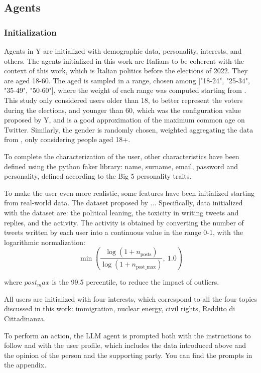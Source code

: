 \subsection{Agents}
\subsubsection{Initialization}
Agents in Y are initialized with demographic data, personality, interests, and others.
The agents initialized in this work are Italians to be coherent with the context of this work, which is Italian politics before the elections of 2022.
They are aged 18-60. The aged is sampled in a range, chosen among ["18-24", "25-34", "35-49", "50-60"], where the weight of each range was computed starting from \cite{statista2024twitter}. This study only considered users older than 18, to better represent the voters during the elections, and younger than 60, which was the configuration value proposed by Y, and is a good approximation of the maximum common age on Twitter.
Similarly, the gender is randomly chosen, weighted aggregating the data from \cite{statista2024twitter}, only considering people aged 18+.

To complete the characterization of the user, other characteristics have been defined using the python faker library: name, surname, email, password and personality, defined according to the Big 5 personality traits.

To make the user even more realistic, some features have been initialized starting from real-world data. The dataset proposed by \citet{pierri2023ita} ... %
Specifically, data initialized with the dataset are: the political leaning, the toxicity in writing tweets and replies, and the activity.
The activity is obtained by converting the number of tweets written by each user into a continuous value in the range 0-1, with the logarithmic normalization:
\[
\min\left( \frac{\log(1 + n_{\text{posts}})}{\log(1 + n_{\text{post\_max}})},\ 1.0 \right)
\]

where $post_max$ is the 99.5 percentile, to reduce the impact of outliers.

All users are initialized with four interests, which correspond to all the four topics discussed in this work: immigration, nuclear energy, civil rights, Reddito di Cittadinanza.

To perform an action, the LLM agent is prompted both with the instructions to follow and with the user profile, which includes the data introduced above and the opinion of the person and the supporting party.
You can find the prompts in the appendix.



